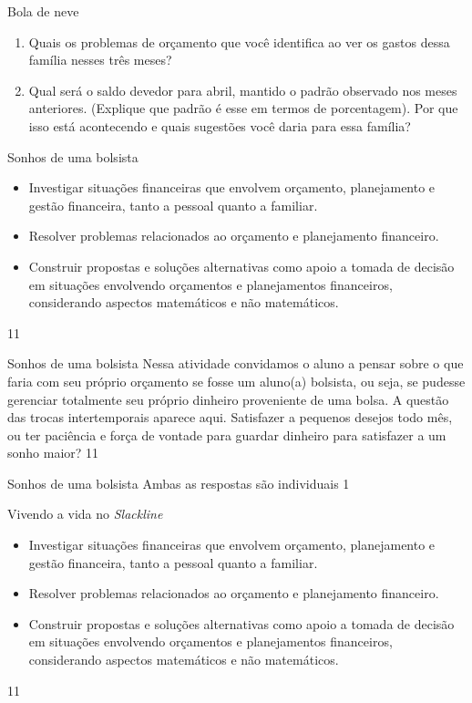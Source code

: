 \begin{task}{Bola de neve}
\begin{enumerate}
\item Quais os problemas de orçamento que você identifica ao ver os gastos dessa família nesses três meses?
\item Qual será o saldo devedor para abril, mantido o padrão observado nos meses anteriores. (Explique que padrão é esse em termos de porcentagem). Por que isso está acontecendo e quais sugestões você daria para essa família?
\end{enumerate}
\end{task}

\clearpage
\def\currentcolor{session2}
\begin{objectives}{Sonhos de uma bolsista}
{
\begin{itemize}
\item Investigar situações financeiras que envolvem orçamento, planejamento e gestão financeira, tanto a pessoal quanto a familiar.
\item Resolver problemas relacionados ao orçamento e planejamento financeiro. 
\item Construir propostas e soluções alternativas como apoio a tomada de decisão em situações envolvendo orçamentos e planejamentos financeiros, considerando aspectos matemáticos e não matemáticos. 
\end{itemize}
}{1}{1}
\end{objectives}
\marginpar{\vspace{-2.5em}}
\begin{sugestions}{Sonhos de uma bolsista}
{
Nessa atividade convidamos o aluno a pensar sobre o que faria com seu próprio orçamento se fosse um aluno(a) bolsista, ou seja, se pudesse gerenciar totalmente seu próprio dinheiro proveniente de uma bolsa. A questão das trocas intertemporais aparece aqui. Satisfazer a pequenos desejos todo mês, ou ter paciência e força de vontade para guardar dinheiro para satisfazer a um sonho maior?
}{1}{1}
\end{sugestions}
\begin{answer}{Sonhos de uma bolsista}
{
  Ambas as respostas são individuais
}{1}
\end{answer}
\begin{objectives}{Vivendo a vida no \textit{Slackline}}
{
\begin{itemize}
\item Investigar situações financeiras que envolvem orçamento, planejamento e gestão financeira, tanto a pessoal quanto a familiar.
\item Resolver problemas relacionados ao orçamento e planejamento financeiro. 
\item Construir propostas e soluções alternativas como apoio a tomada de decisão em situações envolvendo orçamentos e planejamentos financeiros, considerando aspectos matemáticos e não matemáticos. 
\end{itemize}
}{1}{1}
\end{objectives}

